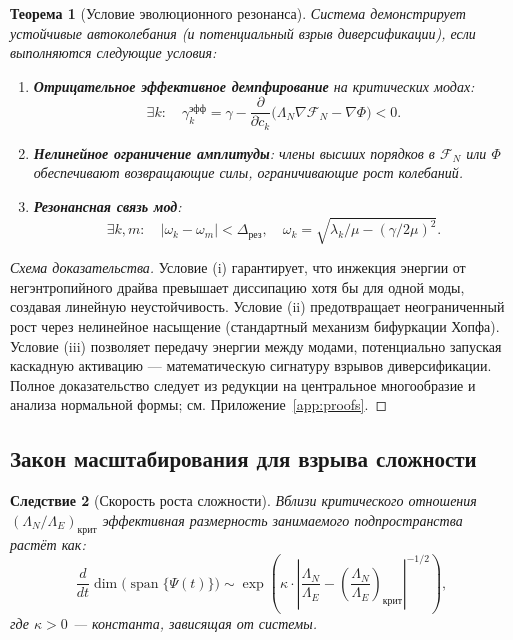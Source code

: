 \documentclass[11pt,a4paper]{article}
\theoremstyle{plain}
\newtheorem{theorem}{Теорема}[section]
\newtheorem{corollary}[theorem]{Следствие}
\theoremstyle{definition}
\theoremstyle{remark}
\newcommand{\Foam}{\Phi}
\newcommand{\Functional}{\mathcal{F}}
\newcommand{\grad}{\nabla}
\begin{document}
\begin{theorem}[Условие эволюционного резонанса]
\label{thm:resonance}
Система демонстрирует устойчивые автоколебания (и потенциальный взрыв диверсификации), если выполняются следующие условия:
\begin{enumerate}[label=(\roman*)]
    \item \textbf{Отрицательное эффективное демпфирование} на критических модах:
    \begin{equation}
    \exists k: \quad \gamma_k^{\text{эфф}} = \gamma - \frac{\partial}{\partial \dot{c}_k}\Big(\Lambda_N \grad\Functional_N - \grad\Foam\Big) < 0.
    \label{eq:negative_damping}
    \end{equation}
    
    \item \textbf{Нелинейное ограничение амплитуды}: члены высших порядков в $\Functional_N$ или $\Foam$ обеспечивают возвращающие силы, ограничивающие рост колебаний.
    
    \item \textbf{Резонансная связь мод}:
    \begin{equation}
    \exists k,m: \quad |\omega_k - \omega_m| < \Delta_{\text{рез}}, \quad \omega_k = \sqrt{\lambda_k/\mu - (\gamma/2\mu)^2}.
    \label{eq:mode_coupling}
    \end{equation}
\end{enumerate}
\end{theorem}

\begin{proof}[Схема доказательства]
Условие (i) гарантирует, что инжекция энергии от негэнтропийного драйва превышает диссипацию хотя бы для одной моды, создавая линейную неустойчивость. Условие (ii) предотвращает неограниченный рост через нелинейное насыщение (стандартный механизм бифуркации Хопфа). Условие (iii) позволяет передачу энергии между модами, потенциально запуская каскадную активацию --- математическую сигнатуру взрывов диверсификации. Полное доказательство следует из редукции на центральное многообразие и анализа нормальной формы; см. Приложение~\ref{app:proofs}.
\end{proof}

\subsection{Закон масштабирования для взрыва сложности}

\begin{corollary}[Скорость роста сложности]
\label{cor:complexity_growth}
Вблизи критического отношения $(\Lambda_N/\Lambda_E)_{\text{крит}}$ эффективная размерность занимаемого подпространства растёт как:
\begin{equation}
\frac{d}{dt} \dim\Big(\operatorname{span}\{\Psi(t)\}\Big) \sim \exp\left( \kappa \cdot \left|\frac{\Lambda_N}{\Lambda_E} - \left(\frac{\Lambda_N}{\Lambda_E}\right)_{\text{крит}}\right|^{-1/2} \right),
\label{eq:complexity_scaling}
\end{equation}
где $\kappa > 0$ --- константа, зависящая от системы.
\end{corollary}
\end{document}
